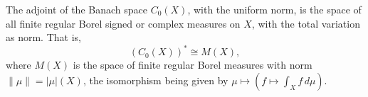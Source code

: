 The adjoint of the Banach space $C_0(X)$, with the uniform norm, is the space of all finite regular Borel signed or complex measures on $X$, with the total variation as norm. That is,
$$(C_0(X))^* \cong M(X),$$
where $M(X)$ is the space of finite regular Borel measures with norm $\|\mu\| = |\mu|(X)$, the isomorphism being given by $\mu \mapsto \left(f \mapsto \int_X f \, d\mu\right)$.
